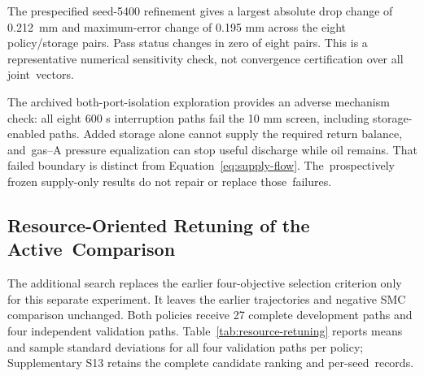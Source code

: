 \documentclass[machines,article,submit,pdftex,moreauthors]{Definitions/mdpi}
\begin{document}
The prespecified seed-5400 refinement gives a largest absolute drop change of \mbox{0.212 mm} and maximum-error change of 0.195 mm across the eight policy/storage pairs. Pass status changes in zero of eight pairs. This is a representative numerical sensitivity check, not convergence certification over all joint~vectors.

The archived both-port-isolation exploration provides an adverse mechanism check: all eight 600 s interruption paths fail the 10 mm screen, including storage-enabled paths. Added storage alone cannot supply the required return balance, and~gas--A pressure equalization can stop useful discharge while oil remains. That failed boundary is distinct from Equation~\eqref{eq:supply-flow}. The~prospectively frozen supply-only results do not repair or replace those~failures.

\subsection{Resource-Oriented Retuning of the Active~Comparison
}\label{sec:resource-retuning}

The additional search replaces the earlier four-objective selection criterion only for this separate experiment. It leaves the earlier trajectories and negative SMC comparison unchanged. Both policies receive 27 complete development paths and four independent validation paths. Table~\ref{tab:resource-retuning} reports means and sample standard deviations for all four validation paths per policy; Supplementary S13 retains the complete candidate ranking and per-seed~records.
\end{document}
